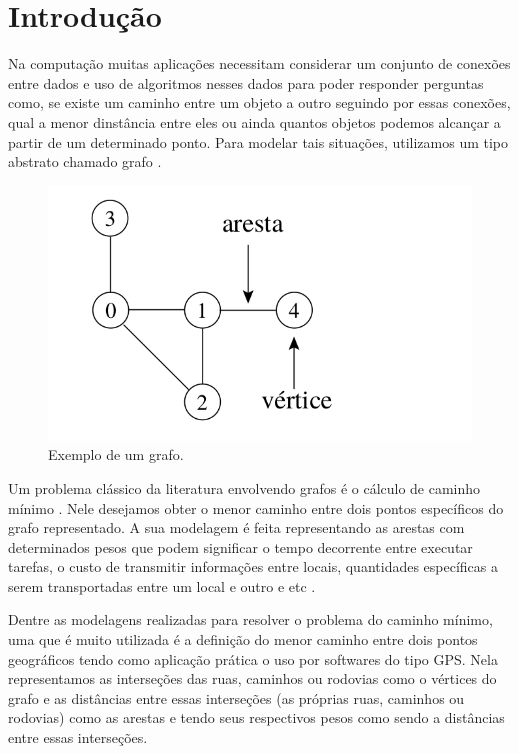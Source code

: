\chapter{Introdução}
\label{sec-intro}
Na computação muitas aplicações necessitam considerar um conjunto de conexões entre dados e uso de algoritmos nesses dados para poder responder perguntas como, se existe um caminho entre um objeto a outro seguindo por essas conexões, qual a menor dinstância entre eles ou ainda quantos objetos podemos alcançar a partir de um determinado ponto. Para modelar tais situações, utilizamos um tipo abstrato chamado grafo \cite{ziviani2004projeto}.

\begin{figure}[H]
\centering
\includegraphics[width=.65\textwidth]{figuras/grafo-exemplo} 
\caption{Exemplo de um grafo.}
\label{fig-intro-exemplografo}
\end{figure}

Um problema clássico da literatura envolvendo grafos é o cálculo de caminho mínimo \cite{moura2010estudo}. Nele desejamos obter o menor caminho entre dois pontos específicos do grafo representado. A sua modelagem é feita representando as arestas com determinados pesos que podem significar o tempo decorrente entre executar tarefas, o custo de transmitir informações entre locais, quantidades específicas a serem transportadas entre um local e outro e etc \cite{drozdek2012data}. 

Dentre as modelagens realizadas para resolver o problema do caminho mínimo, uma que é muito utilizada é a definição do menor caminho entre dois pontos geográficos tendo como aplicação prática o uso por softwares do tipo GPS. Nela representamos as interseções das ruas, caminhos ou rodovias como o vértices do grafo e as distâncias entre essas interseções (as próprias ruas, caminhos ou rodovias) como as arestas e tendo seus respectivos pesos como sendo a distâncias entre essas interseções.

